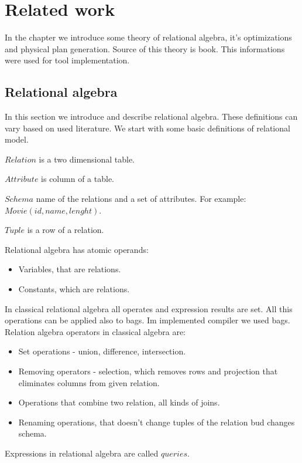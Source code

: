 \chapter{Related work}
In the chapter we introduce some theory of relational algebra, it's optimizations and physical plan generation. Source of this theory is book\cite{database}. This informations were used for tool implementation.
\section{Relational algebra}

In this section we introduce and describe relational algebra\cite{database}. These definitions can vary based on used literature. We start with some basic definitions of relational model.

\begin{mydef}
$Relation$ is a two dimensional table.
\end{mydef}
\begin{mydef}
$Attribute$ is column of a table.
\end{mydef}
\begin{mydef}
$Schema$ name of the relations and a set of attributes. For example:~$Movie(id,name,lenght)$.
\end{mydef}
\begin{mydef}
$Tuple$ is a row of a relation.
\end{mydef}

Relational algebra has atomic operands:
\begin{itemize}
\item Variables, that are relations.
\item Constants, which are relations. 
\end{itemize}

In classical relational algebra all operates and expression results are set. All this operations can be applied also to bags. Im implemented compiler we used bags.
Relation algebra operators in classical algebra are:
\begin{itemize}
\item Set operations - union, difference, intersection.
\item Removing operators - selection, which removes rows and projection that eliminates columns from given relation.
\item Operations that combine two relation, all kinds of joins.
\item Renaming operations, that doesn't change tuples of the relation bud changes schema.
\end{itemize}
Expressions in relational algebra are called $queries$.

